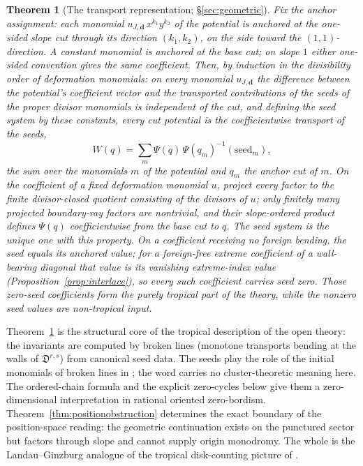 \documentclass[11pt]{amsart}
\newtheorem{theorem}{Theorem}[section]
\theoremstyle{definition}
\theoremstyle{remark}
\newcommand{\Dscr}{\mathfrak{D}}
\begin{document}
\begin{theorem}[The transport representation; \S\ref{sec:geometric}]
\label{thm:transport}
Fix the \emph{anchor assignment}: each monomial
$u_{J,\mathbf d}\,x^{k_{1}}y^{k_{2}}$ of the potential is anchored at the
one-sided slope cut through its direction $(k_{1},k_{2})$, on the side toward
the $(1,1)$-direction. A constant monomial is anchored at the base cut; on
slope $1$ either one-sided convention gives the same coefficient. Then, by
induction in the divisibility order of deformation monomials: on every monomial
$u_{J,\mathbf d}$ the difference between the potential's coefficient vector and
the transported contributions of the seeds of the proper divisor monomials is
\emph{independent of the cut}, and defining the \emph{seed system} by these
constants, every cut potential is the coefficientwise transport of the seeds,
\[
W(q)=\sum_{m}\Psi(q)\,\Psi(q_{m})^{-1}(\mathrm{seed}_{m}),
\]
the sum over the monomials $m$ of the potential and $q_{m}$ the anchor cut
of $m$. On the coefficient of a fixed deformation monomial $u$, project every
factor to the finite divisor-closed quotient consisting of the divisors of $u$;
only finitely many projected boundary-ray factors are nontrivial, and their
slope-ordered product defines $\Psi(q)$ coefficientwise from the base cut to
$q$. The seed system
is the unique one with this property. On a coefficient receiving no foreign
bending, the seed equals its anchored value; for a foreign-free extreme
coefficient of a
wall-bearing diagonal that value is its vanishing extreme-index value
(Proposition~\ref{prop:interlace}), so every such coefficient
carries seed zero. Those
zero-seed coefficients form the purely tropical part of the theory, while the
nonzero seed values are non-tropical input.
\end{theorem}

Theorem~\ref{thm:transport} is the structural core of the tropical description
of the open theory: the invariants are computed by broken lines (monotone
transports bending at the walls of $\Dscr^{r,s}$) from canonical seed data.
The seeds play the role of the initial monomials of broken lines in
\cite{Gross10,CPS}; the word carries no cluster-theoretic meaning here.  The
ordered-chain formula and the explicit zero-cycles below give them a
zero-dimensional interpretation in rational oriented zero-bordism.
Theorem~\ref{thm:positionobstruction}
determines the exact boundary of the position-space reading: the geometric
continuation exists on the punctured sector but factors through slope and
cannot supply origin monodromy.  The whole is the
Landau--Ginzburg analogue of the tropical disk-counting picture of
\cite{Gross10,CPS}.
\end{document}

